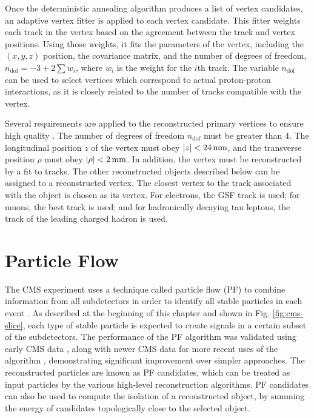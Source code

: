 Once the deterministic annealing algorithm produces a list of vertex candidates, an adaptive vertex fitter is applied to each vertex candidate. This fitter weights each track in the vertex based on the agreement between the track and vertex positions. Using those weights, it fits the parameters of the vertex, including the $(x,y,z)$ position, the covariance matrix, and the number of degrees of freedom, $n_{\text{dof}} = -3 + 2 \sum{w_i}$, where $w_i$ is the weight for the $i$th track. The variable $n_{\text{dof}}$ can be used to select vertices which correspond to actual proton-proton interactions, as it is closely related to the number of tracks compatible with the vertex.

Several requirements are applied to the reconstructed primary vertices to ensure high quality \cite{CMS-PAS-TRK-10-005}. The number of degrees of freedom $n_{\text{dof}}$ must be greater than 4. The longitudinal position $z$ of the vertex must obey $|z|<24\,\text{mm}$, and the transverse position $\rho$ must obey $|\rho|<2\,\text{mm}$. In addition, the vertex must be reconstructed by a fit to tracks. The other reconstructed objects described below can be assigned to a reconstructed vertex. The closest vertex to the track associated with the object is chosen as its vertex. For electrons, the GSF track is used; for muons, the best track is used; and for hadronically decaying tau leptons, the track of the leading charged hadron is used.


\section{Particle Flow
\label{sec:particle-flow}}

The CMS experiment uses a technique called particle flow (PF) to combine information from all subdetectors in order to identify all stable particles in each event \cite{CMS-PAS-PFT-09-001}. As described at the beginning of this chapter and shown in Fig. \ref{fig:cms-slice}, each type of stable particle is expected to create signals in a certain subset of the subdetectors. The performance of the PF algorithm was validated using early CMS data \cite{CMS-PAS-PFT-10-002,CMS-PAS-PFT-10-003}, along with newer CMS data for more recent uses of the algorithm \cite{Beaudette:2014cea}, demonstrating significant improvement over simpler approaches. The reconstructed particles are known as PF candidates, which can be treated as input particles by the various high-level reconstruction algorithms. PF candidates can also be used to compute the isolation of a reconstructed object, by summing the energy of candidates topologically close to the selected object.

